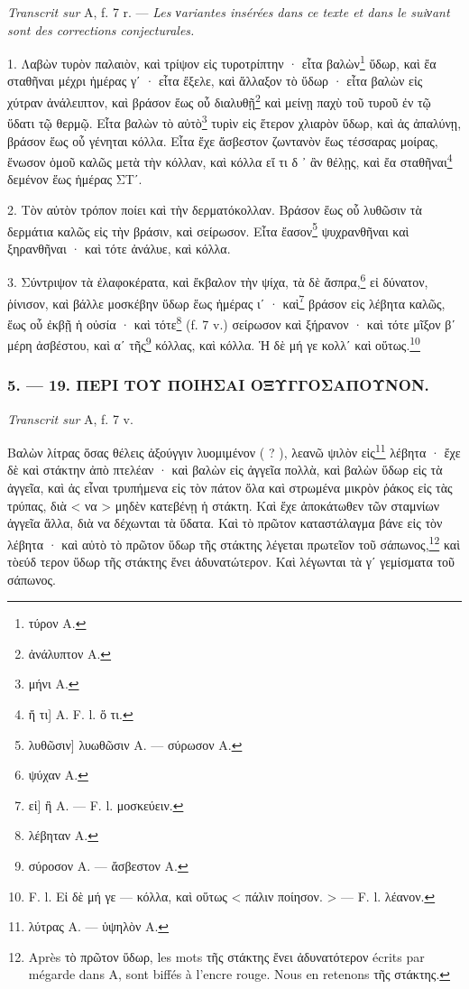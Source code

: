 \documentclass[a4paper, 11pt, oneside, polutonikogreek, french]{article}
\begin{document}
\emph{Transcrit sur} A, f. 7 r. --- \emph{Les νariantes insérées dans ce texte et dans le suiνant sont des corrections conjecturales.}

\bigskip

1. Λαβὼν τυρὸν παλαιὸν, καὶ τρίψον εἰς τυροτρίπτην · εἶτα βαλὼν\footnote{τύρον A.} ὕδωρ, καὶ ἔα σταθῆναι μέχρι ἡμέρας γʹ · εἶτα ἔξελε, καὶ ἄλλαξον τὸ ὕδωρ · εἶτα βαλὼν εἰς χύτραν ἀνάλειπτον, καὶ βράσον ἕως οὗ διαλυθῇ\footnote{ἀνάλυπτον A.} καὶ μείνῃ παχὺ τοῦ τυροῦ ἐν τῷ ὕδατι τῷ θερμῷ. Εἶτα βαλὼν τὸ αὐτὸ\footnote{μήνι A.} τυρὶν εἰς ἕτερον χλιαρὸν ὕδωρ, καὶ ἀς ἀπαλύνῃ, βράσον ἕως οὗ γένηται κόλλα. Εἶτα ἔχε ἄσβεστον ζωντανὸν ἕως τέσσαρας μοίρας, ἕνωσον ὁμοῦ καλῶς μετὰ τὴν κόλλαν, καὶ κόλλα εἴ τι δ ᾽ ἂν θέλῃς, καὶ ἔα σταθῆναι\footnote{ἤ τι] A. F. l. ὅ τι.} δεμένον ἕως ἡμέρας ΣΤʹ.

2. Τὸν αὐτὸν τρόπον ποίει καὶ τὴν δερματόκολλαν. Βράσον ἕως οὗ λυθῶσιν τὰ δερμάτια καλῶς εἰς τὴν βράσιν, καὶ σείρωσον. Εἶτα ἔασον\footnote{λυθῶσιν] λυωθῶσιν A. --- σύρωσον A.} ψυχρανθῆναι καὶ ξηρανθῆναι · καὶ τότε ἀνάλυε, καὶ κόλλα.

3. Σύντριψον τὰ ἐλαφοκέρατα, καὶ ἔκβαλον τὴν ψίχα, τὰ δὲ ἄσπρα,\footnote{ψύχαν A.} εἰ δύνατον, ῥίνισον, καὶ βάλλε μοσκέβην ὕδωρ ἕως ἡμέρας ιʹ · καὶ\footnote{εἰ] ἢ A. --- F. l. μοσκεύειν.} βράσον εἰς λέβητα καλῶς, ἕως οὗ ἐκβῇ ἡ οὐσία · καὶ τότε\footnote{λέβηταν A.} (f. 7 v.) σείρωσον καὶ ξήρανον · καὶ τότε μῖξον βʹ μέρη ἀσβέστου, καὶ αʹ τῆς\footnote{σύροσον A. --- ἄσβεστον A.} κόλλας, καὶ κόλλα. Ἡ δὲ μή γε κολλʹ καὶ οὕτως.\footnote{F. l. Εἰ δὲ μή γε --- κόλλα, καὶ οὕτως < πάλιν ποίησον. > --- F. l. λέανον.}

\bigskip
\centerline{\EightStarTaper}
\centerline{\EightStarTaper\EightStarTaper}
\bigskip

\subsubsection{5. --- 19. ΠΕΡΙ ΤΟΥ ΠΟΙΗΣΑΙ ΟΞΥΓΓΟΣΑΠΟΥΝΟΝ.}

\emph{Transcrit sur} A, f. 7 v.

\bigskip

Βαλὼν λίτρας ὅσας θέλεις ἀξούγγιν λυομιμένον ( ? ), λεανῶ ψιλὸν εἰς\footnote{λύτρας A. --- ὑψηλὸν A.} λέβητα · ἔχε δὲ καὶ στάκτην ἀπὸ πτελέαν · καὶ βαλὼν εἰς ἀγγεῖα πολλὰ, καὶ βαλὼν ὕδωρ εἰς τὰ ἀγγεῖα, καὶ ἀς εἶναι τρυπήμενα εἰς τὸν πάτον ὅλα καὶ στρωμένα μικρὸν ῥάκος εἰς τὰς τρύπας, διὰ < να > μηδὲν κατεβένῃ ἡ στάκτη. Καὶ ἔχε ἀποκάτωθεν τῶν σταμνίων ἀγγεῖα ἄλλα, διὰ να δέχωνται τὰ ὕδατα. Καὶ τὸ πρῶτον καταστάλαγμα βάνε εἰς τὸν λέβητα · καὶ αὐτὸ τὸ πρῶτον ὕδωρ τῆς στάκτης λέγεται πρωτεῖον τοῦ σάπωνος,\footnote{Après τὸ πρῶτον ὕδωρ, les mots τῆς στάκτης ἔνει ἀδυνατότερον écrits par mégarde dans A, sont biffés à l'encre rouge. Nous en retenons τῆς στάκτης.} καὶ τὸεύδ τερον ὕδωρ τῆς στάκτης ἔνει ἀδυνατώτερον. Καὶ λέγωνται τὰ γʹ γεμίσματα τοῦ σάπωνος.
\end{document}
